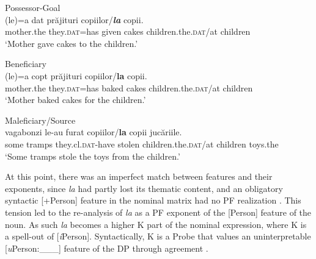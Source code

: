 \documentclass[output=paper,modfonts,nonflat,newtxmath]{langsci/langscibook}
\begin{document}
\ea %
      \label{ex:cornilescu:12}
      Possessor-Goal\\
       {(le)=a} {dat} {prăjituri} copiilor/\textbf{\textit{la}} {copii.} \\
           mother.the they.\textsc{dat}=has given cakes children.the.\textsc{dat}/at children\\
      \glt ‘Mother gave cakes to the children.’
      \z



\ea%
      \label{ex:cornilescu:13}
      Beneficiary \\
       {(le)=a} {copt} prăjituri copiilor/\textbf{{la}} {copii}.\\
             mother.the they.\textsc{dat}=has baked cakes children.the.\textsc{dat}/at children\\
      \glt ‘Mother baked cakes {for} the children.’
      \z


 

\ea%
      \label{ex:cornilescu:14}
      Maleficiary/Source \\
       {vagabonzi} {le-au} {furat} copiilor/\textbf{la} {copii} {jucăriile.} \\
             some tramps they.cl.\textsc{dat-}have stolen children.the.\textsc{dat}/at children toys.the\\
      \glt ‘Some tramps stole the toys from the children.’
      \z

At this point, there was an imperfect match between features and their exponents, since \textit{la} had partly lost its thematic content, and an obligatory syntactic [+Person] feature in the nominal matrix had no PF realization . This tension led to the re-analysis of \textit{la} as a PF exponent of the [Person] feature of the noun. As such \textit{la} becomes a higher K part of the nominal expression, where K is a spell-out of [\textit{i}Person]. Syntactically, K is a Probe that values an uninterpretable [\textit{u}Person:\_\_\_] feature of the DP through agreement .
\end{document}

